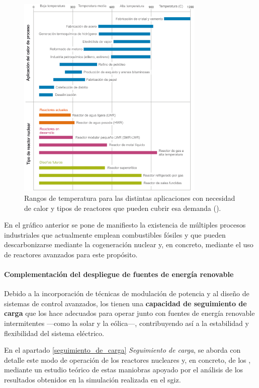 \begin{figure}[h]
  \centering
  \includegraphics[width=0.8\textwidth]{content/figures/aplicaciones_calor.png}
  \caption{Rangos de temperatura para las distintas aplicaciones con necesidad de calor y tipos de reactores que pueden cubrir esa demanda (\cite{wna_heat_applications}).}
  \label{fig:wna_heat_applications}
\end{figure}

En el gráfico anterior se pone de manifiesto la existencia de múltiples procesos industriales que actualmente emplean combustibles fósiles y que pueden descarbonizarse mediante la cogeneración nuclear y, en concreto, mediante el uso de reactores avanzados para este propósito.

\paragraph{Complementación del despliegue de fuentes de energía renovable}

Debido a la incorporación de técnicas de modulación de potencia y al diseño de sistemas de control avanzados, los  tienen una \textbf{capacidad de seguimiento de carga} que los hace adecuados para operar junto con fuentes de energía renovable intermitentes ---como la solar y la eólica---, contribuyendo así a la estabilidad y flexibilidad del sistema eléctrico.

En el apartado \ref{seguimiento_de_carga} \textit{Seguimiento de carga}, se aborda con detalle este modo de operación de los reactores nucleares y, en concreto, de los , mediante un estudio teórico de estas maniobras apoyado por el análisis de los resultados obtenidos en la simulación realizada en el \acrshort{sgiz}.

